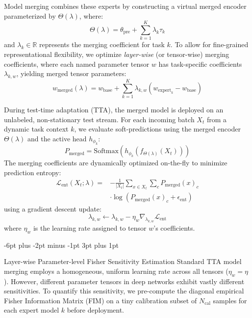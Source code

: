 \documentclass{article}
\makeatletter
\theoremstyle{plain}
\theoremstyle{definition}
\theoremstyle{remark}
\renewcommand{\subsection}{\@startsection{subsection}{2}{\z@}%
                          {-6pt plus -2pt minus -1pt}%
                          {3pt plus 1pt}%
                          {\normalfont\normalsize\bfseries\raggedright}}
\makeatother
\begin{document}
Model merging combines these experts by constructing a virtual merged encoder parameterized by $\Theta(\lambda)$, where:
\begin{equation}
\Theta(\lambda) = \theta_{\text{pre}} + \sum_{k=1}^K \lambda_{k} \tau_k
\end{equation}
and $\lambda_k \in \mathbb{R}$ represents the merging coefficient for task $k$. To allow for fine-grained representational flexibility, we optimize \emph{layer-wise} (or tensor-wise) merging coefficients, where each named parameter tensor $w$ has task-specific coefficients $\lambda_{k, w}$, yielding merged tensor parameters:
\begin{equation}
w_{\text{merged}}(\lambda) = w_{\text{base}} + \sum_{k=1}^K \lambda_{k, w} (w_{\text{expert}_k} - w_{\text{base}})
\end{equation}

During test-time adaptation (TTA), the merged model is deployed on an unlabeled, non-stationary test stream. For each incoming batch $X_t$ from a dynamic task context $k$, we evaluate soft-predictions using the merged encoder $\Theta(\lambda)$ and the active head $h_{\phi_k}$:
\begin{equation}
P_{\text{merged}} = \text{Softmax}\left(h_{\phi_k}\left(f_{\Theta(\lambda)}(X_t)\right)\right)
\end{equation}
The merging coefficients are dynamically optimized on-the-fly to minimize prediction entropy:
\begin{equation}
\label{eq:entropy_loss}
\begin{split}
\mathcal{L}_{\text{ent}}(X_t; \lambda) = &- \frac{1}{|X_t|} \sum_{x \in X_t} \sum_{c} P_{\text{merged}}(x)_c \\
&\cdot \log\left(P_{\text{merged}}(x)_c + \epsilon_{\text{ent}}\right)
\end{split}
\end{equation}
using a gradient descent update:
\begin{equation}
\lambda_{k, w} \leftarrow \lambda_{k, w} - \eta_{w} \nabla_{\lambda_{k, w}} \mathcal{L}_{\text{ent}}
\end{equation}
where $\eta_w$ is the learning rate assigned to tensor $w$'s coefficients.

\subsection{Layer-wise Parameter-level Fisher Sensitivity Estimation}
Standard TTA model merging employs a homogeneous, uniform learning rate across all tensors ($\eta_w = \eta$). However, different parameter tensors in deep networks exhibit vastly different sensitivities. To quantify this sensitivity, we pre-compute the diagonal empirical Fisher Information Matrix (FIM) on a tiny calibration subset of $N_{\text{cal}}$ samples for each expert model $k$ before deployment.
\end{document}
